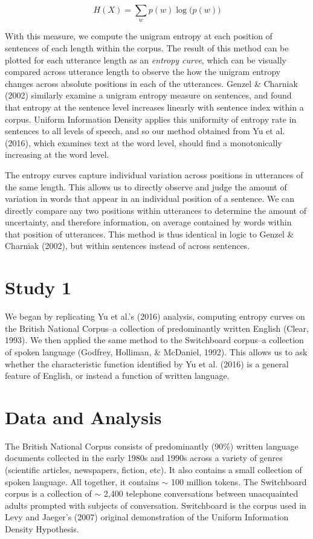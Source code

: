 \documentclass[10pt, letterpaper]{article}
\begin{document}
\[H(X) = \sum\limits_w p(w)\log\big(p(w)\big)\]

With this measure, we compute the unigram entropy at each position of
sentences of each length within the corpus. The result of this method
can be plotted for each utterance length as an \emph{entropy curve},
which can be visually compared across utterance length to observe the
how the unigram entropy changes across absolute positions in each of the
utterances. Genzel \& Charniak (2002) similarly examine a unigram
entropy measure on sentences, and found that entropy at the sentence
level increases linearly with sentence index within a corpus. Uniform
Information Density applies this uniformity of entropy rate in sentences
to all levels of speech, and so our method obtained from Yu et al.
(2016), which examines text at the word level, should find a
monotonically increasing at the word level.

The entropy curves capture individual variation across positions in
utterances of the same length. This allows us to directly observe and
judge the amount of variation in words that appear in an individual
position of a sentence. We can directly compare any two positions within
utterances to determine the amount of uncertainty, and therefore
information, on average contained by words within that position of
utterances. This method is thus identical in logic to Genzel \& Charniak
(2002), but within sentences instead of across sentences.

\hypertarget{study-1}{%
\section{Study 1}\label{study-1}}

We began by replicating Yu et al.'s (2016) analysis, computing entropy
curves on the British National Corpus--a collection of predominantly
written English (Clear, 1993). We then applied the same method to the
Switchboard corpus--a collection of spoken language (Godfrey, Holliman,
\& McDaniel, 1992). This allows us to ask whether the characteristic
function identified by Yu et al. (2016) is a general feature of English,
or instead a function of written language.

\hypertarget{data-and-analysis}{%
\section{Data and Analysis}\label{data-and-analysis}}

The British National Corpus consists of predominantly (90\%) written
language documents collected in the early 1980s and 1990s across a
variety of genres (scientific articles, newspapers, fiction, etc). It
also contains a small collection of spoken language. All together, it
contains \(\sim\) 100 million tokens. The Switchboard corpus is a
collection of \(\sim\) 2,400 telephone conversations between
unacquainted adults prompted with subjects of conversation. Switchboard
is the corpus used in Levy and Jaeger's (2007) original demonstration of
the Uniform Information Density Hypothesis.
\end{document}
